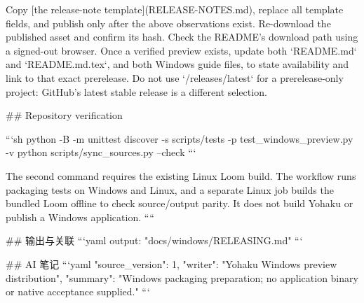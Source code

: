 Copy [the release-note template](RELEASE-NOTES.md), replace all template fields,
and publish only after the above observations exist. Re-download the published
asset and confirm its hash. Check the README's download path using a signed-out
browser. Once a verified preview exists, update both `README.md` and
`README.md.tex`, and both Windows guide files, to state availability and link to
that exact prerelease. Do not use `/releases/latest` for a prerelease-only project:
GitHub's latest stable release is a different selection.

## Repository verification

```sh
python -B -m unittest discover -s scripts/tests -p test_windows_preview.py -v
python scripts/sync_sources.py --check
```

The second command requires the existing Linux Loom build. The workflow runs
packaging tests on Windows and Linux, and a separate Linux job builds the
bundled Loom offline to check source/output parity. It does not build Yohaku
or publish a Windows application.
````

## 输出与关联
```yaml
output: "docs/windows/RELEASING.md"
```

## AI 笔记
```yaml
{"source_version": 1, "writer": "Yohaku Windows preview distribution", "summary": "Windows packaging preparation; no application binary or native acceptance supplied."}
```
